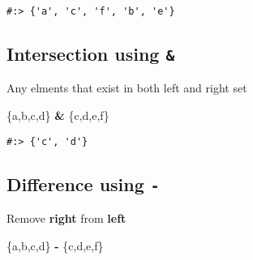 \documentclass[
]{book}
\newenvironment{Shaded}{\begin{snugshade}}{\end{snugshade}}
\newcommand{\NormalTok}[1]{#1}
\newcommand{\OperatorTok}[1]{\textcolor[rgb]{0.43,0.43,0.43}{\textbf{#1}}}
\newcommand{\StringTok}[1]{\textcolor[rgb]{0.5,0.5,0.5}{#1}}
\begin{document}
\begin{verbatim}
#:> {'a', 'c', 'f', 'b', 'e'}
\end{verbatim}

\hypertarget{intersection-using}{%
\subsection{\texorpdfstring{Intersection using \texttt{\&}}{Intersection using \&}}\label{intersection-using}}

Any elments that exist in both left and right set

\begin{Shaded}
\begin{Highlighting}[]
\NormalTok{\{}\StringTok{\textquotesingle{}a\textquotesingle{}}\NormalTok{,}\StringTok{\textquotesingle{}b\textquotesingle{}}\NormalTok{,}\StringTok{\textquotesingle{}c\textquotesingle{}}\NormalTok{,}\StringTok{\textquotesingle{}d\textquotesingle{}}\NormalTok{\} }\OperatorTok{\&}\NormalTok{ \{}\StringTok{\textquotesingle{}c\textquotesingle{}}\NormalTok{,}\StringTok{\textquotesingle{}d\textquotesingle{}}\NormalTok{,}\StringTok{\textquotesingle{}e\textquotesingle{}}\NormalTok{,}\StringTok{\textquotesingle{}f\textquotesingle{}}\NormalTok{\}}
\end{Highlighting}
\end{Shaded}

\begin{verbatim}
#:> {'c', 'd'}
\end{verbatim}

\hypertarget{difference-using--}{%
\subsection{\texorpdfstring{Difference using \texttt{-}}{Difference using -}}\label{difference-using--}}

Remove \textbf{right} from \textbf{left}

\begin{Shaded}
\begin{Highlighting}[]
\NormalTok{\{}\StringTok{\textquotesingle{}a\textquotesingle{}}\NormalTok{,}\StringTok{\textquotesingle{}b\textquotesingle{}}\NormalTok{,}\StringTok{\textquotesingle{}c\textquotesingle{}}\NormalTok{,}\StringTok{\textquotesingle{}d\textquotesingle{}}\NormalTok{\} }\OperatorTok{{-}}\NormalTok{ \{}\StringTok{\textquotesingle{}c\textquotesingle{}}\NormalTok{,}\StringTok{\textquotesingle{}d\textquotesingle{}}\NormalTok{,}\StringTok{\textquotesingle{}e\textquotesingle{}}\NormalTok{,}\StringTok{\textquotesingle{}f\textquotesingle{}}\NormalTok{\}}
\end{Highlighting}
\end{Shaded}
\end{document}
